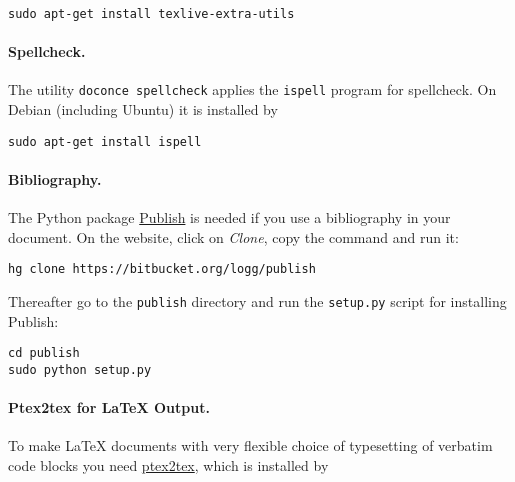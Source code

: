 \documentclass[%
oneside,                 %
final,                   %
10pt]{article}
\begin{document}
\vspace{4pt}
\begin{Verbatim}[numbers=none,frame=lines,label=\fbox{{\tiny Terminal}},fontsize=\fontsize{9pt}{9pt},
labelposition=topline,framesep=2.5mm,framerule=0.7pt]
sudo apt-get install texlive-extra-utils
\end{Verbatim}

\paragraph{Spellcheck.}
The utility {\fontsize{10pt}{10pt}\Verb!doconce spellcheck!} applies the {\fontsize{10pt}{10pt}\Verb!ispell!} program for
spellcheck. On Debian (including Ubuntu) it is installed by

\vspace{4pt}
\begin{Verbatim}[numbers=none,frame=lines,label=\fbox{{\tiny Terminal}},fontsize=\fontsize{9pt}{9pt},
labelposition=topline,framesep=2.5mm,framerule=0.7pt]
sudo apt-get install ispell
\end{Verbatim}


\paragraph{Bibliography.}
The Python package \href{{https://bitbucket.org/logg/publish}}{Publish} is needed if you use a bibliography
in your document. On the website, click on \emph{Clone}, copy the
command and run it:

\vspace{4pt}
\begin{Verbatim}[numbers=none,frame=lines,label=\fbox{{\tiny Terminal}},fontsize=\fontsize{9pt}{9pt},
labelposition=topline,framesep=2.5mm,framerule=0.7pt]
hg clone https://bitbucket.org/logg/publish
\end{Verbatim}
Thereafter go to the {\fontsize{10pt}{10pt}\Verb!publish!} directory and run the {\fontsize{10pt}{10pt}\Verb!setup.py!} script
for installing Publish:

\vspace{4pt}
\begin{Verbatim}[numbers=none,frame=lines,label=\fbox{{\tiny Terminal}},fontsize=\fontsize{9pt}{9pt},
labelposition=topline,framesep=2.5mm,framerule=0.7pt]
cd publish
sudo python setup.py
\end{Verbatim}


\paragraph{Ptex2tex for {\LaTeX} Output.}
To make {\LaTeX} documents with very flexible choice of typesetting of
verbatim code blocks you need \href{{http://code.google.com/p/ptex2tex}}{ptex2tex},
which is installed by
\end{document}
